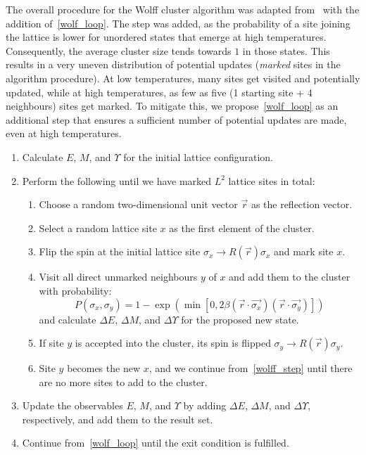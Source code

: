 		The overall procedure for the Wolff cluster algorithm was adapted from~\citet[p. 361]{wolff} with the addition of~\cref{wolf_loop}. The step was added, as the probability of a site joining the lattice is lower for unordered states that emerge at high temperatures. Consequently, the average cluster size tends towards $1$ in those states. This results in a very uneven distribution of potential updates (\emph{marked} sites in the algorithm procedure). At low temperatures, many sites get visited and potentially updated, while at high temperatures, as few as five (1 starting site + 4 neighbours) sites get marked. To mitigate this, we propose~\cref{wolf_loop} as an additional step that ensures a sufficient number of potential updates are made, even at high temperatures.
		\begin{enumerate}
			\item Calculate $E$, $M$, and $\Upsilon$ for the initial lattice configuration.
			\item \label{wolf_loop} Perform the following until we have marked $L^2$ lattice sites in total:
			\begin{enumerate}
				\item Choose a random two-dimensional unit vector $\vec{r}$ as the reflection vector.
				\item Select a random lattice site $x$ as the first element of the cluster.
				\item Flip the spin at the initial lattice site $\sigma_x \rightarrow R(\vec{r}) \sigma_x$ and mark site $x$.
				\item \label{wolff_step} Visit all direct unmarked neighbours $y$ of $x$ and add them to the cluster with probability:
					\begin{equation}\label{eq:wolff}
						P(\sigma_x, \sigma_y) = 1 - \exp(\min[0, 2 \beta (\vec{r}\cdot\vec{\sigma_x}) (\vec{r}\cdot\vec{\sigma_y})])
					\end{equation}
					and calculate $\Delta E$, $\Delta M$, and $\Delta \Upsilon$ for the proposed new state.
				\item If site $y$ is accepted into the cluster, its spin is flipped $\sigma_y \rightarrow R(\vec{r}) \sigma_y$.
				\item Site $y$ becomes the new $x$, and we continue from~\cref{wolff_step} until there are no more sites to add to the cluster.
			\end{enumerate}
			\item Update the observables $E$, $M$, and $\Upsilon$ by adding $\Delta E$, $\Delta M$, and $\Delta \Upsilon$, respectively, and add them to the result set.
			\item Continue from~\cref{wolf_loop} until the exit condition is fulfilled.
		\end{enumerate}
	
